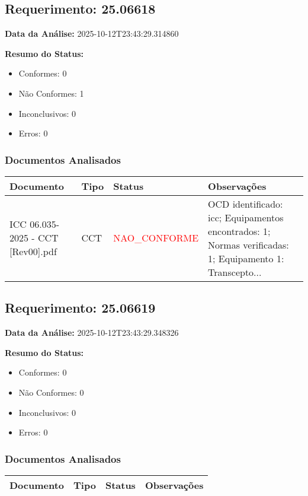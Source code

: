 \documentclass[12pt,a4paper]{article}
\begin{document}
\subsection{Requerimento: 25.06618}

\textbf{Data da Análise:} 2025-10-12T23:43:29.314860

\textbf{Resumo do Status:}
\begin{itemize}
    \item Conformes: 0
    \item Não Conformes: 1
    \item Inconclusivos: 0
    \item Erros: 0
\end{itemize}

\subsubsection{Documentos Analisados}

\begin{longtable}{|p{4cm}|p{2cm}|p{2cm}|p{6cm}|}
\hline
\textbf{Documento} & \textbf{Tipo} & \textbf{Status} & \textbf{Observações} \\
\hline
\endhead
ICC 06.035-2025 - CCT [Rev00].pdf & CCT & \textcolor{red}{NAO\_CONFORME} & OCD identificado: icc; Equipamentos encontrados: 1; Normas verificadas: 1; Equipamento 1: Transcepto... \\
\hline
\end{longtable}


\subsection{Requerimento: 25.06619}

\textbf{Data da Análise:} 2025-10-12T23:43:29.348326

\textbf{Resumo do Status:}
\begin{itemize}
    \item Conformes: 0
    \item Não Conformes: 0
    \item Inconclusivos: 0
    \item Erros: 0
\end{itemize}

\subsubsection{Documentos Analisados}

\begin{longtable}{|p{4cm}|p{2cm}|p{2cm}|p{6cm}|}
\hline
\textbf{Documento} & \textbf{Tipo} & \textbf{Status} & \textbf{Observações} \\
\hline
\endhead
\end{longtable}
\end{document}

